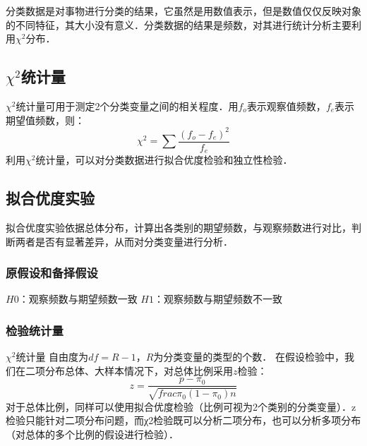 分类数据是对事物进行分类的结果，它虽然是用数值表示，但是数值仅仅反映对象的不同特征，其大小没有意义．分类数据的结果是频数，对其进行统计分析主要利用$\chi^2$分布．
\subsection{$\chi^2$统计量}
$\chi^2$统计量可用于测定2个分类变量之间的相关程度．用$f_o$表示观察值频数，$f_e$表示期望值频数，则：
\begin{equation}
\chi^2 =  \sum \frac {(f_o-f_e)^2}{f_e}
\end{equation}
利用$\chi^2$统计量，可以对分类数据进行拟合优度检验和独立性检验．
\subsection{拟合优度实验}
拟合优度实验依据总体分布，计算出各类别的期望频数，与观察频数进行对比，判断两者是否有显著差异，从而对分类变量进行分析．
\subsubsection{原假设和备择假设}
$H0$：观察频数与期望频数一致
$H1$：观察频数与期望频数不一致
\subsubsection{检验统计量}
$\chi^2$统计量
自由度为$df=R−1$，$R$为分类变量的类型的个数．
在假设检验中，我们在二项分布总体、大样本情况下，对总体比例采用$z$检验：
\begin{equation}
z = \frac {p-\pi_0}{\sqrt{
    frac{\pi_0(1-\pi_0)}{n}
}}
\end{equation}
对于总体比例，同样可以使用拟合优度检验（比例可视为2个类别的分类变量）．z检验只能针对二项分布问题，而χ2检验既可以分析二项分布，也可以分析多项分布（对总体的多个比例的假设进行检验）．